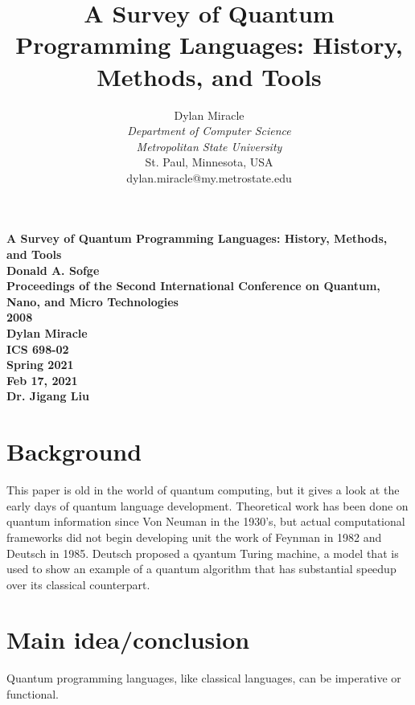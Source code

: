 \documentclass{article}
\begin{document}
\begin{titlepage}
    \begin{center}
        \vspace{4cm}
        \large
        \textbf{
            A Survey of Quantum Programming Languages: History, Methods, and Tools \\
            Donald A. Sofge \\
            Proceedings of the Second International Conference on Quantum, Nano, and Micro Technologies \\
            2008 \\
            Dylan Miracle \\
            ICS 698-02 \\
            Spring 2021 \\
            Feb 17, 2021 \\
            Dr. Jigang Liu
        }
    \end{center}
\end{titlepage}
\title{A Survey of Quantum Programming Languages: History, Methods, and Tools}

\author{Dylan Miracle\\
\textit{Department of Computer Science} \\
\textit{Metropolitan State University}\\
St. Paul, Minnesota, USA \\
dylan.miracle@my.metrostate.edu
}

\maketitle
\section{Background}
This paper is old in the world of quantum computing, but it gives a look at the early days of quantum language development. Theoretical work has been done on quantum information since Von Neuman in the 1930's, but actual computational frameworks did not begin developing unit the work of Feynman in 1982 and Deutsch in 1985. Deutsch proposed a qyantum Turing machine, a model that is used to show an example of a quantum algorithm that has substantial speedup over its classical counterpart.
\section{Main idea/conclusion}
Quantum programming languages, like classical languages, can be imperative or functional. 
\end{document}
